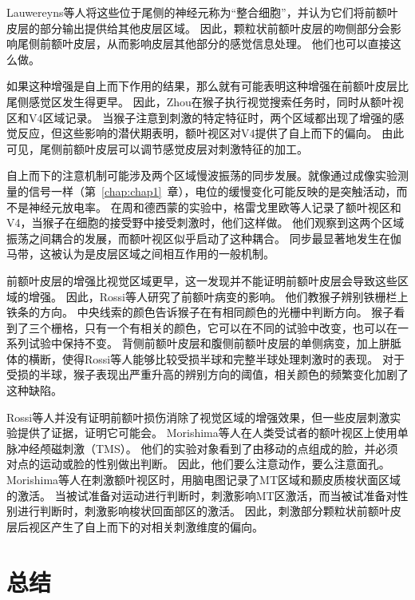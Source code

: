 Lauwereyns等人将这些位于尾侧的神经元称为“整合细胞”，并认为它们将前额叶皮层的部分输出提供给其他皮层区域。
因此，颗粒状前额叶皮层的吻侧部分会影响尾侧前额叶皮层，从而影响皮层其他部分的感觉信息处理。
他们也可以直接这么做。


如果这种增强是自上而下作用的结果，那么就有可能表明这种增强在前额叶皮层比尾侧感觉区发生得更早。
因此，Zhou\cite{zhou2011feature}在猴子执行视觉搜索任务时，同时从额叶视区和V4区域记录。
当猴子注意到刺激的特定特征时，两个区域都出现了增强的感觉反应，但这些影响的潜伏期表明，额叶视区对V4提供了自上而下的偏向。
由此可见，尾侧前额叶皮层可以调节感觉皮层对刺激特征的加工。


自上而下的注意机制可能涉及两个区域慢波振荡的同步发展。就像通过成像实验测量的信号一样（第~\ref{chap:chap1}~章），电位的缓慢变化可能反映的是突触活动，而不是神经元放电率。
在周和德西蒙的实验中，格雷戈里欧等人\cite{gregoriou2009high}记录了额叶视区和V4，当猴子在细胞的接受野中接受刺激时，他们这样做。
他们观察到这两个区域振荡之间耦合的发展，而额叶视区似乎启动了这种耦合。
同步最显著地发生在伽马带，这被认为是皮层区域之间相互作用的一般机制\cite{womelsdorf2007modulation}。


前额叶皮层的增强比视觉区域更早，这一发现并不能证明前额叶皮层会导致这些区域的增强。
因此，Rossi等人\cite{rossi2009prefrontal}研究了前额叶病变的影响。
他们教猴子辨别铁栅栏上铁条的方向。
中央线索的颜色告诉猴子在有相同颜色的光栅中判断方向。
猴子看到了三个栅格，只有一个有相关的颜色，它可以在不同的试验中改变，也可以在一系列试验中保持不变。
背侧前额叶皮层和腹侧前额叶皮层的单侧病变，加上胼胝体的横断，使得Rossi等人能够比较受损半球和完整半球处理刺激时的表现。
对于受损的半球，猴子表现出严重升高的辨别方向的阈值，相关颜色的频繁变化加剧了这种缺陷。


Rossi等人并没有证明前额叶损伤消除了视觉区域的增强效果，但一些皮层刺激实验提供了证据，证明它可能会。
Morishima等人\cite{morishima2009task}在人类受试者的额叶视区上使用单脉冲经颅磁刺激（TMS）。
他们的实验对象看到了由移动的点组成的脸，并必须对点的运动或脸的性别做出判断。
因此，他们要么注意动作，要么注意面孔。
Morishima等人在刺激额叶视区时，用脑电图记录了MT区域和颞皮质梭状面区域的激活。
当被试准备对运动进行判断时，刺激影响MT区激活，而当被试准备对性别进行判断时，刺激影响梭状回面部区的激活。
因此，刺激部分颗粒状前额叶皮层后视区产生了自上而下的对相关刺激维度的偏向。



\section{总结}

